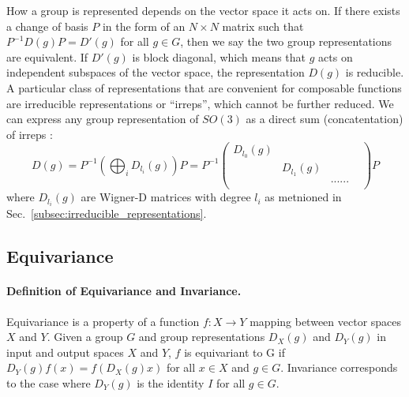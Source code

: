 How a group is represented depends on the vector space it acts on.
If there exists a change of basis $P$ in the form of an $N \times N$ matrix such that $P^{-1} D(g) P = D'(g)$ for all $g \in G$, then we say the two group representations are equivalent.
If $D'(g)$ is block diagonal, which means that $g$ acts on independent subspaces of the vector space, the representation $D(g)$ is reducible.
A particular class of representations that are convenient for composable functions are irreducible representations or ``irreps'', which cannot be further reduced. 
We can express any group representation of $SO(3)$ as a direct sum (concatentation) of irreps \citep{zee,Dresselhaus2007,e3nn}:
\begin{equation}
D(g) = P ^{-1} \left ( \bigoplus_{i} D_{l_i}(g) \right)  P = 
P^{-1}
\begin{pmatrix}
D_{l_0}(g) & & \\
& D_{l_1}(g) & & \\
& & ...... \\
\end{pmatrix}
P
\end{equation}
where $D_{l_i}(g)$ are Wigner-D matrices with degree $l_i$ as metnioned in Sec.~\ref{subsec:irreducible_representations}.




\subsection{Equivariance}
\label{appendix:subsec:equivariance}


\paragraph{Definition of Equivariance and Invariance.}
Equivariance is a property of a function $f: X \rightarrow Y$ mapping between vector spaces $X$ and $Y$.
Given a group $G$ and group representations $D_{X}(g)$ and $D_{Y}(g)$ in input and output spaces $X$ and $Y$, $f$ is equivariant to G if $D_Y(g) f(x) = f(D_X(g)x)$ for all $x \in X$ and $g \in G$.
Invariance corresponds to the case where $D_Y(g)$ is the identity $I$ for all $g \in G$.


